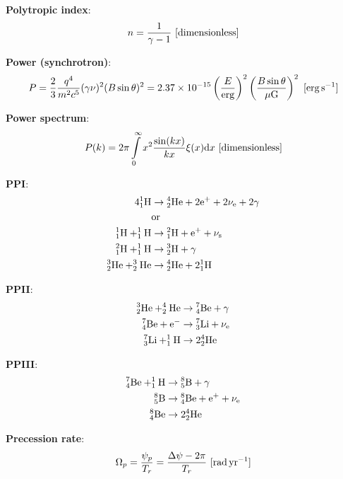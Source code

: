 \documentclass[a4paper,10pt]{article}
\begin{document}
{\noindent}\textbf{Polytropic index}:
\begin{align*}
    n = \frac{1}{\gamma-1} ~ [{\rm dimensionless}]
\end{align*}

{\noindent}\textbf{Power (synchrotron)}:
\begin{align*}
    P = \frac{2}{3}\frac{q^4}{m^2c^5} (\gamma\nu)^2 (B\sin\theta)^2 = 2.37\times10^{-15} \left(\frac{E}{{\rm erg}}\right)^2 \left(\frac{B\sin\theta}{\mu{\rm G}}\right)^2 ~ [{\rm erg\,s^{-1}}]
\end{align*}

{\noindent}\textbf{Power spectrum}:
\begin{align*}
    P(k) = 2\pi \int\limits_0^\infty x^2\frac{\sin(kx)}{kx}\xi(x)\mathrm{d}x ~ [{\rm dimensionless}]
\end{align*}

{\noindent}\textbf{PPI}:
\begin{align*}
    {\rm 4^1_1H} &\rightarrow {\rm ^4_2He + 2e^+ + 2\nu_e + 2\gamma} \\
    &{\rm or} \\
    {\rm ^1_1H + ^1_1H} &\rightarrow {\rm ^2_1H + e^+ + \nu_s} \\
    {\rm ^2_1H + ^1_1H} &\rightarrow {\rm ^3_2H + \gamma} \\
    {\rm ^3_2He + ^3_2He} &\rightarrow {\rm ^4_2He + 2^1_1H}
\end{align*}

{\noindent}\textbf{PPII}:
\begin{align*}
    {\rm ^3_2He + ^4_2He} &\rightarrow {\rm ^7_4Be + \gamma} \\
    {\rm ^7_4Be + e^-} &\rightarrow {\rm ^7_3Li + \nu_e} \\
    {\rm ^7_3Li + ^1_1H} &\rightarrow {\rm 2^4_2He}
\end{align*}

{\noindent}\textbf{PPIII}:
\begin{align*}
    {\rm ^7_4Be + ^1_1H} &\rightarrow {\rm ^8_5B + \gamma} \\
    {\rm ^8_5B} &\rightarrow {\rm ^8_4Be + e^+ + \nu_e} \\
    {\rm ^8_4Be} &\rightarrow {\rm 2^4_2He}
\end{align*}

{\noindent}\textbf{Precession rate}:
\begin{align*}
    \Omega_p = \frac{\psi_p}{T_r} = \frac{\Delta\psi-2\pi}{T_r} ~ [{\rm rad\,yr^{-1}}]
\end{align*}
\end{document}
